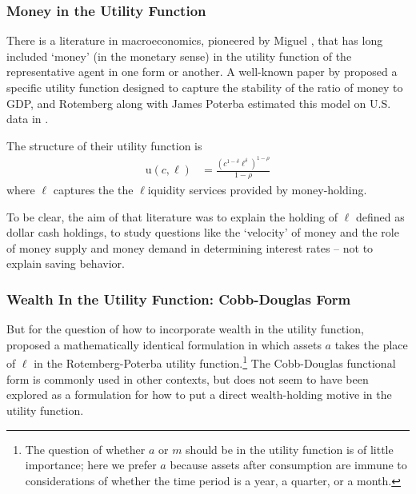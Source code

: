 \documentclass{article}
\newcommand{\CRRA}{\rho}
\newcommand{\uFunc}{\mathrm{u}}
\newcommand{\cNrm}{c}
\newcommand{\aNrm}{a}
\newcommand{\mNrm}{m}
\newcommand{\lqdt}{\ell}
\begin{document}
\subsubsection{Money in the Utility Function}

There is a literature in macroeconomics, pioneered by Miguel \cite{sidrauski1967rational}, that has long included `money' (in the monetary sense) in the utility function of the representative agent in one form or another.
A well-known paper by \cite{Rotemberg1984} proposed a specific utility function designed to capture the stability of the ratio of money to GDP, and Rotemberg along with James Poterba estimated this model on U.S. data in \cite{Poterba_1986}.

The structure of their utility function is
\begin{align}
    \uFunc(\cNrm,\lqdt) & = \frac{\left(
        \cNrm^{1-\delta}\lqdt^{\delta}
        \right)^{1-\CRRA}}{1-\CRRA}
\end{align}
where $\lqdt$ captures the the $\lqdt$iquidity services provided by money-holding.

To be clear, the aim of that literature was to explain the holding of $\lqdt$ defined as dollar cash holdings, to study questions like the `velocity' of money and the role of money supply and money demand in determining interest rates -- not to explain saving behavior.

\subsubsection{Wealth In the Utility Function: Cobb-Douglas Form}

But for the question of how to incorporate wealth in the utility function, \cite{Tzitzouris2024} proposed a mathematically identical formulation in which assets $\aNrm$ takes the place of $\lqdt$ in the Rotemberg-Poterba utility function.\footnote{The question of whether $\aNrm$ or $\mNrm$ should be in the utility function is of little importance; here we prefer $\aNrm$ because assets after consumption are immune to considerations of whether the time period is a year, a quarter, or a month.}
The Cobb-Douglas functional form is commonly used in other contexts, but does not seem to have been explored as a formulation for how to put a direct wealth-holding motive in the utility function.

\end{document}
